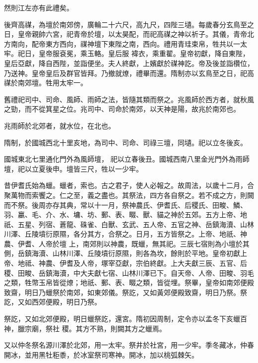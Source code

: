 \begin{pinyinscope}
 然則江左亦有此禮矣。



 後齊高禖，為壇於南郊傍，廣輪二十六尺，高九尺，四陛三壝。每歲春分玄鳥至之日，皇帝親帥六宮，祀青帝於壇，以太昊配，而祀高禖之神以祈子。其儀，青帝北方南向，配帝東方西向，禖神壇下東陛之南，西向。禮用青珪束帛，牲共以一太牢。祀日，皇帝服袞冕，乘玉輅。皇后服
 褘衣，乘重翟。皇帝初獻，降自東陛，皇后亞獻，降自西陛，並詣便坐。夫人終獻，上嬪獻於禖神訖。帝及後並詣欑位，乃送神。皇帝皇后及群官皆拜。乃撤就燎，禮畢而還。隋制亦以玄鳥至之日，祀高禖於南郊壇。牲用太牢一。



 舊禮祀司中、司命、風師、雨師之法，皆隨其類而祭之。兆風師於西方者，就秋風之勁，而不從箕星之位。兆司中、司命於南郊，以天神是陽，故兆於南郊也。



 兆雨師於北郊者，就水位，在北也。



 隋制，於國城西北十里亥地，為司中、司命、司祿三壇，同壝。祀以立冬後亥。



 國城東北七里通化門外為風師壇，
 祀以立春後丑。國城西南八里金光門外為雨師壇，祀以立夏後申。壇皆三尺，牲以一少牢。



 昔伊耆氏始為蠟。蠟者，索也。古之君子，使人必報之。故周法，以歲十二月，合聚萬物而索饗之。仁之至，義之盡也。其祭法，四方各自祭之。若不成之方，則闕而不祭。後周亦存其典，常以十一月，祭神農氏、伊耆氏、后稷氏、田畯、鱗、羽、臝、毛、介、水、墉、坊、郵、表、畷、獸、貓之神於五郊。五方上帝、地祇、五星、列宿、蒼龍、硃雀、白獸、玄武、五人帝、五官之神、岳鎮海瀆、山林川澤、丘陵墳衍原隰，各分其方，合祭之。日月，五方皆祭之。上帝、地祇、神農、伊耆、人帝於壇
 上，南郊則以神農，既蠟，無其祀。三辰七宿則為小壇於其側，岳鎮海瀆、山林川澤、丘陵墳衍原隰，則各為坎，餘則於平地。皇帝初獻上帝、地祗、神農、伊耆及人帝，塚宰亞獻，宗伯終獻。上大夫獻三辰、五官、后稷、田畯、岳鎮海瀆，中大夫獻七宿、山林川澤已下。自天帝、人帝、田畯、羽毛之類，牲幣玉帛皆從燎；地祇、郵、表、畷之類，皆從埋。祭畢，皇帝如南郊便殿致齋，明日乃蠟祭於南郊，如東郊儀。祭訖，又如黃郊便殿致齋，明日乃祭。祭訖，又如西郊便殿，明日乃祭。



 祭訖，又如北郊便殿，明日蠟祭訖，還宮。隋初因周制，定令亦以孟冬下亥蠟百神，臘宗廟，祭社
 稷。其方不熟，則闕其方之蠟焉。



 又以仲冬祭名源川澤於北郊，用一太牢。祭井於社宮，用一少牢。季冬藏冰，仲春開冰，並用黑牡秬黍，於冰室祭司寒神。開冰，加以桃弧棘矢。




\end{pinyinscope}
